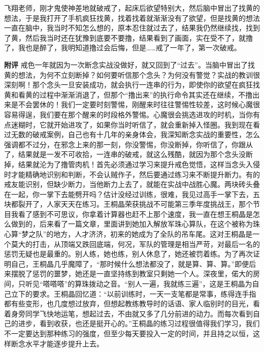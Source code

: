 \begin{case}
    飞翔老师，刚才鬼使神差地就破戒了，起床后欲望特别大，然后脑中冒出了找黄的想法，于是我打开了手机疯狂找黄，找着找着就渐渐没有了欲望，但是找黄的想法一直在脑中，我当时不知怎么想的，原本忍住就过去了，结果我仍然继续找，找到了黄，然后我当时还在犹豫到底要不要撸，结果看到了画面，实在受不了，就撸了，我也是醉了，我明知道撸过会后悔，但是……戒了一年了，第一次破戒。

    \textbf{附评} 戒色一年就因为一次断念实战没做好，就又回到了“过去”。当脑中冒出了找黄的想法，为何不立刻断掉？如何要听信那个念头？为何没有警觉？实战的教训很深刻啊！那个念头一旦安装成功，就会执行一连串的行为，即使你的欲望在疯狂找黄和看黄的过程中渐渐消退了，但那个“撸出来”的执行命令其实还在继续，不撸出来是不会罢休的！我们一定要时刻警惕，刚醒来时往往警惕性较差，这时候心魔很容易得逞，我们要在那个醒来的时段格外警惕。心魔很会挑选进攻的时机，当你有点迷糊时，它就开始进攻了，如果你当时听信了，就会重新掉入怪圈。我到现在看过无数的破戒案例，自己也有十几年的亲身体会，我深知断念实战的重要性，怎么强调都不过分，在邪念上来的那一刻，你没警惕，你没断掉，你听信了，你跟从了，结果就是一发不可收拾，一连串的破戒，就这么残酷，就因为那个念头没断掉，结果就沦为了撸管肉机！首先必须通过学习来提升戒色觉悟，这样当念头入侵时才能精确地识别和判断，不会认贼作子，然后要通过练习来不断提升断力。有的戒友能识别，但缺少断力，当他断力上去了，就能在实战中战胜心魔。两块砖头叠在一起，你一掌下去能劈开吗？估计没经过训练，很难，我见过高手一掌下去，五块都裂开了，人家天天在练习。王桐晶荣获挑战不可能第三季年度挑战王，那个节目我看了感到不可思议，你拿着计算器也赶不上那个速度，我一直在想王桐晶是怎么做到的，后来看了一篇文章，里面讲到她加入解放军珠心算队，在这个被称为珠心算“梦之队”的地方，人才济济，初来的她成为了全队的吊车尾。这对王桐晶是一个莫大的打击，从顶端又跌回底端，何况，军队的管理是相当严苛，对最后一名的惩罚无疑也是最重的。别人练，她也练，别人休息了，她还被罚着练。为了再次证明自己，王桐晶几乎魔障了，“那时候什么想法都没了，就是算、算、算。”即便后来摆脱了惩罚的噩梦，她还是一直坚持练到教室只剩她一个人。深夜里，偌大的房间，只听见“嗒嗒嗒”的算珠拨动之音。“别人一遍，我就练三遍”，这是王桐晶为自己立下的要求。王桐晶回忆道：“以前训练时，一天一支笔都是常事，练得连手指都有些变形，也几度想过放弃，但想起教练教导时的话语、家人临别时的目光，看着身旁同学飞快地运笔，想起过去，不由就又多了几分前进的动力。而每次看到自己的进步，看到收获，也还是挺开心的。”王桐晶的练习过程很值得我们学习，我们不一定要达到那种练习的强度，但至少每天要投入一定的时间，并且持之以恒，这样断念水平才能逐步提升上去。
\end{case}

